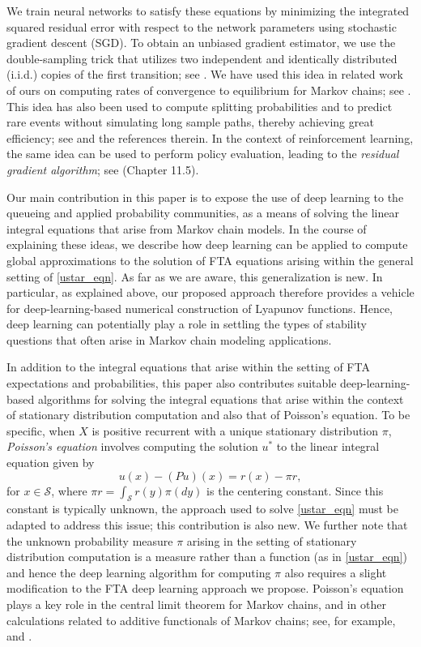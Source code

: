 \documentclass[pdflatex,sn-mathphys-ay]{sn-jnl}%
\numberwithin{equation}{section}
\newcommand{\Scal}{\mathcal{S}}
\theoremstyle{thmstyleone}%
\theoremstyle{thmstyletwo}%
\theoremstyle{thmstylethree}%
\begin{document}
We train neural networks to satisfy these equations by minimizing the integrated squared residual error with respect to the network parameters using stochastic gradient descent (SGD). To obtain an unbiased gradient estimator, we use the double-sampling trick that utilizes two independent and identically distributed (i.i.d.) copies of the first transition; see \cite{goda2023constructing}. We have used this idea in related work of ours on computing rates of convergence to equilibrium for Markov chains; see \cite{qu2024deep}. This idea has also been used to compute splitting probabilities and to predict rare events without simulating long sample paths, thereby achieving great efficiency; see \cite{strahan2023predicting,cheng2024surprising} and the references therein. In the context of reinforcement learning, the same idea can be used to perform policy evaluation, leading to the {\it residual gradient algorithm}; see \cite{baird1995residual,baird1998gradient,sutton2018reinforcement} (Chapter 11.5).

Our main contribution in this paper is to expose the use of deep learning to the queueing and applied probability communities, as a means of solving the linear integral equations that arise from Markov chain models. In the course of explaining these ideas, we describe how deep learning can be applied to compute global approximations to the solution of FTA equations arising within the general setting of \eqref{ustar_eqn}. As far as we are aware, this generalization is new. In particular, as explained above, our proposed approach therefore provides a vehicle for deep-learning-based numerical construction of Lyapunov functions. Hence,  deep learning can potentially play a role in settling the types of stability questions that often arise in Markov chain modeling applications.  

In addition to the integral equations that arise within the setting of FTA expectations and probabilities, this paper also contributes suitable deep-learning-based algorithms for solving the integral equations that arise within the context of stationary distribution computation and also that of Poisson's equation. To be specific, when $X$ is positive recurrent with a unique stationary distribution $\pi$, {\it Poisson's equation} involves computing the solution $u^*$ to the linear integral equation given by 
\begin{equation}
\label{poisson_eqn}
u(x)-(Pu)(x)=r(x)-\pi r,
\end{equation}
for $x\in\Scal$, where $\pi r=\int_\Scal r(y)\pi(dy)$ is the centering constant. Since this constant is typically unknown, the approach used to solve \eqref{ustar_eqn} must be adapted to address this issue; this contribution is also new. We further note that the unknown probability measure $\pi$ arising in the setting of stationary distribution computation is a measure rather than a function (as in \eqref{ustar_eqn}) and hence the deep learning algorithm for computing $\pi$ also requires a slight modification to the FTA deep learning approach we propose. Poisson's equation plays a key role in the central limit theorem for Markov chains, and in other calculations related to additive functionals of Markov chains; see, for example, \cite{maigret1978theoreme} and \cite{kurtz1981central}. 
\end{document}
